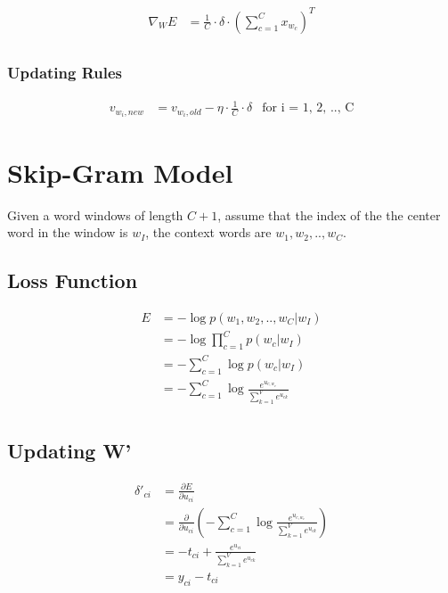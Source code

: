 \documentclass{article}
\begin{document}
	\begin{equation}
		\begin{aligned}
			\nabla_W E &= \frac{1}{C} \cdot \delta \cdot \left(\sum_{c=1}^{C} x_{w_{c}}\right)^T \\
		\end{aligned}
	\end{equation}
	
	\subsubsection*{Updating Rules}
	\begin{framed}
	\begin{equation}
		\begin{aligned}
			v_{w_i, new} &= v_{w_i, old} - \eta \cdot \frac{1}{C} \cdot \delta &\mbox{for i = 1, 2, .., C}
		\end{aligned}
	\end{equation}
	\end{framed}
	
	\newpage
	\section{Skip-Gram Model}
	Given a word windows of length $C+1$, assume that the index of the the center word in the window is $w_I$, the context words are $w_1, w_2, .., w_C$.
	\subsection{Loss Function}
	\begin{equation}
		\begin{aligned}
			E &=-\log p(w_{1}, w_{2}, .., w_{C}|w_{I})\\ 
			&= -\log \prod_{c=1}^{C} p(w_{c}|w_{I}) \\
			&= -\sum_{c=1}^{C} \log p(w_{c}|w_{I}) \\ 
			&= -\sum_{c=1}^{C} \log \frac{e^{u_{c,w_c}}}{\sum_{k=1}^{V}e^{u_{ck}}} \\ 
		\end{aligned}
	\end{equation}
	
	\subsection{Updating W'}
	\begin{equation}
		\begin{aligned}
			\delta'_{ci} &= \frac{\partial E}{\partial u_{ci}} \\
			&= \frac{\partial}{\partial u_{ci}} \left(
			-\sum_{c=1}^{C} \log \frac{e^{u_{c,w_c}}}{\sum_{k=1}^{V}e^{u_{ck}}} \right) \\
			&= -t_{ci} + \frac{e^{u_{ci}}}{\sum_{k=1}^{V}e^{u_{ck}}} \\
			&= y_{ci} - t_{ci}
		\end{aligned}
	\end{equation}
	
\end{document}
